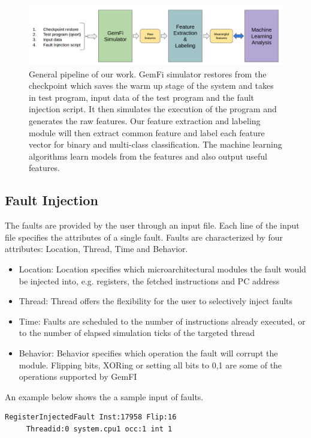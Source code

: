 \begin{figure}[t]
\begin{center}
   \includegraphics[width=0.95\linewidth]{./figures/pipeline.png}
\end{center}
   \caption{\footnotesize General pipeline of our work. GemFi simulator restores from the checkpoint which saves the warm up stage of the system and takes in test program, input data of the test program and the fault injection script. It then simulates the execution of the program and generates the raw features. Our feature extraction and labeling module will then extract common feature and label each feature vector for binary and multi-class classification. The machine learning algorithms learn models from the features and also output useful features.}
\label{fig:pipeline}
\end{figure}



\subsection{Fault Injection}\label{section:FI}
The faults are provided by the user through an input file. Each line of the input file specifies the attributes of a single fault. Faults are characterized by four attributes: Location, Thread, Time and Behavior. 
\begin{itemize}
\item Location: Location specifies which microarchitectural modules the fault would be injected into, e.g. registers, the fetched instructions and PC address
\item Thread: Thread offers the flexibility for the user to selectively inject faults
\item Time: Faults are scheduled to the number of instructions already executed, or to the number of elapsed simulation ticks of the targeted thread
\item Behavior: Behavior specifies which operation the fault will corrupt the module. Flipping bits, XORing or setting all bits to 0,1 are some of the operations supported by GemFI
\end{itemize}

An example below shows the a sample input of faults. 
\begin{lstlisting}	
RegisterInjectedFault Inst:17958 Flip:16 
     Threadid:0 system.cpu1 occ:1 int 1
\end{lstlisting}

